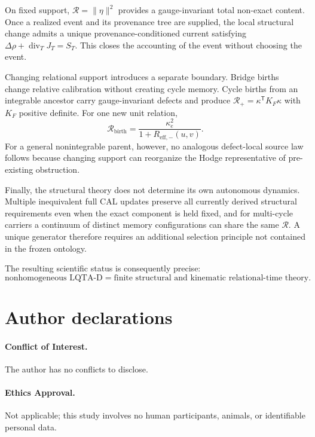 \documentclass[aip,jmp,amsmath,amssymb,reprint]{revtex4-2}
\newcommand{\Rcal}{\mathcal{R}}
\newcommand{\divT}{\operatorname{div}_{T}}
\begin{document}
On fixed support, $\Rcal=\|\eta\|^2$ provides a gauge-invariant total non-exact content. Once a realized event and its provenance tree are supplied, the local structural change admits a unique provenance-conditioned current satisfying $\Delta\rho+\divT J_T=S_T$. This closes the accounting of the event without choosing the event.

Changing relational support introduces a separate boundary. Bridge births change relative calibration without creating cycle memory. Cycle births from an integrable ancestor carry gauge-invariant defects and produce $\Rcal_+=\kappa^{\mathsf T}K_F\kappa$ with $K_F$ positive definite. For one new unit relation,
\begin{equation}
\Rcal_{\mathrm{birth}}
=\frac{\kappa_e^2}{1+R_{\mathrm{eff},-}(u,v)}.
\end{equation}
For a general nonintegrable parent, however, no analogous defect-local source law follows because changing support can reorganize the Hodge representative of pre-existing obstruction.

Finally, the structural theory does not determine its own autonomous dynamics. Multiple inequivalent full CAL updates preserve all currently derived structural requirements even when the exact component is held fixed, and for multi-cycle carriers a continuum of distinct memory configurations can share the same $\Rcal$. A unique generator therefore requires an additional selection principle not contained in the frozen ontology.

The resulting scientific status is consequently precise:
\begin{equation}
\boxed{
\text{nonhomogeneous LQTA-D}
=\text{finite structural and kinematic relational-time theory}.
}
\end{equation}

\section*{Author declarations}

\paragraph*{Conflict of Interest.}
The author has no conflicts to disclose.

\paragraph*{Ethics Approval.}
Not applicable; this study involves no human participants, animals, or identifiable personal data.
\end{document}
